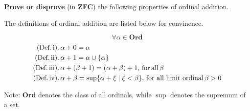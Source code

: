 \documentclass[addpoints]{exam}
\begin{document}
\begin{questions}
\begin{parts}
\end{parts}



\question \textbf{Prove or disprove} (in \textbf{ZFC}) the following properties of ordinal addition. 

The definitions of ordinal addition are listed below for convinence.

$$\forall\alpha\in \textbf{Ord}$$
\begin{align*}
\textrm{(Def.\,i)}&.\,\alpha+0=\alpha\\
\textrm{(Def.\,ii)}&.\,\alpha+1=\alpha\cup\{\alpha\}\\
\textrm{(Def.\,iii)}&.\,\alpha+(\beta+1)=(\alpha+\beta)+1,\,\mathrm{for\,all}\,\beta\\
\textrm{(Def.\,iv)}&.\,\alpha+\beta=\sup\{\alpha+\xi\mid\xi<\beta\},\,\textrm{for all limit ordinal}\,\beta>0\\
\end{align*}

Note: \textbf{Ord} denotes the class of all ordinals, while $\sup$ denotes the supremum of a set.


\end{questions}
\end{document}

